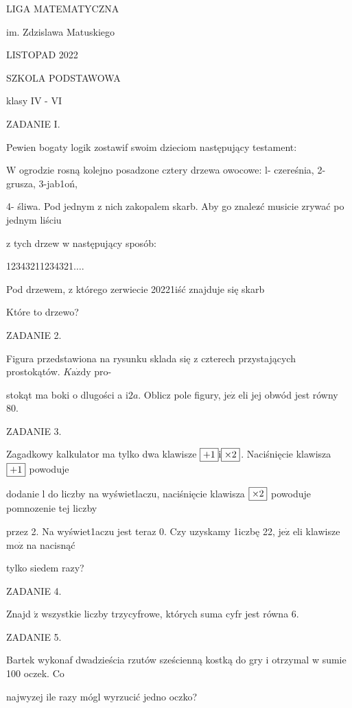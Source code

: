 \documentclass[a4paper,12pt]{article}
\begin{document}
LIGA MATEMATYCZNA

im. Zdzislawa Matuskiego

LISTOPAD 2022

SZKOLA PODSTAWOWA

klasy IV - VI

ZADANIE I.

Pewien bogaty logik zostawif swoim dzieciom następujący testament:

$\mathrm{W}$ ogrodzie rosną kolejno posadzone cztery drzewa owocowe: l- czereśnia, 2- grusza, 3-jab1oń,

4- śliwa. Pod jednym z nich zakopalem skarb. Aby go znalez$\acute{}$ć musicie zrywać po jednym liściu

z tych drzew w następujący sposób:

12343211234321$\ldots.$

Pod drzewem, z którego zerwiecie 20221iść znajduje się skarb

Które to drzewo?

ZADANIE 2.

Figura przedstawiona na rysunku sklada się z czterech przystających prostokątów. $K\mathrm{a}\dot{\mathrm{z}}\mathrm{d}\mathrm{y}$ pro-

stokąt ma boki o dlugości a $\mathrm{i}2a$. Oblicz pole figury, $\mathrm{j}\mathrm{e}\dot{\mathrm{z}}$ eli jej obwód jest równy 80.

ZADANIE 3.

Zagadkowy kalkulator ma tylko dwa klawisze $\fbox{$+1$} \mathrm{i} \fbox{$\times 2$}$. Naciśnięcie klawisza $\fbox{$+1$}$ powoduje

dodanie l do liczby na wyświetlaczu, naciśnięcie klawisza $\fbox{$\times 2$}$ powoduje pomnozenie tej liczby

przez 2. Na wyświet1aczu jest teraz 0. Czy uzyskamy 1iczbę 22, $\mathrm{j}\mathrm{e}\dot{\mathrm{z}}$ eli klawisze $\mathrm{m}\mathrm{o}\dot{\mathrm{z}}$ na nacisnąć

tylko siedem razy?

ZADANIE 4.

Znajd $\acute{\mathrm{z}}$ wszystkie liczby trzycyfrowe, których suma cyfr jest równa 6.

ZADANIE 5.

Bartek wykonaf dwadzieścia rzutów sześcienną kostką do gry i otrzymal w sumie 100 oczek. Co

najwyzej ile razy mógl wyrzucić jedno oczko?
\end{document}
